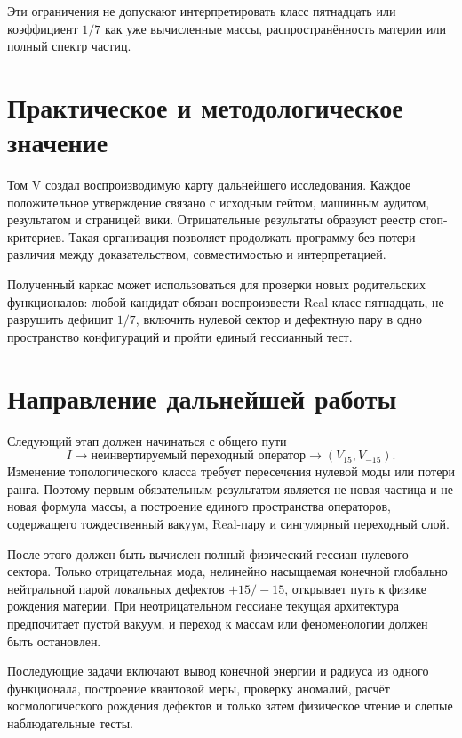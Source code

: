 Эти ограничения не допускают интерпретировать класс пятнадцать или
коэффициент $1/7$ как уже вычисленные массы, распространённость материи
или полный спектр частиц.

\section*{Практическое и методологическое значение}

Том V создал воспроизводимую карту дальнейшего исследования. Каждое
положительное утверждение связано с исходным гейтом, машинным аудитом,
результатом и страницей вики. Отрицательные результаты образуют реестр
стоп-критериев. Такая организация позволяет продолжать программу без
потери различия между доказательством, совместимостью и интерпретацией.

Полученный каркас может использоваться для проверки новых родительских
функционалов: любой кандидат обязан воспроизвести Real-класс пятнадцать,
не разрушить дефицит $1/7$, включить нулевой сектор и дефектную пару в
одно пространство конфигураций и пройти единый гессианный тест.

\section*{Направление дальнейшей работы}

Следующий этап должен начинаться с общего пути
\begin{equation}
 I
 \longrightarrow
 \text{неинвертируемый переходный оператор}
 \longrightarrow
 (V_{15},V_{-15}).
\end{equation}
Изменение топологического класса требует пересечения нулевой моды или
потери ранга. Поэтому первым обязательным результатом является не новая
частица и не новая формула массы, а построение единого пространства
операторов, содержащего тождественный вакуум, Real-пару и сингулярный
переходный слой.

После этого должен быть вычислен полный физический гессиан нулевого
сектора. Только отрицательная мода, нелинейно насыщаемая конечной
глобально нейтральной парой локальных дефектов $+15/-15$, открывает путь к
физике рождения материи. При неотрицательном гессиане текущая архитектура
предпочитает пустой вакуум, и переход к массам или феноменологии должен
быть остановлен.

Последующие задачи включают вывод конечной энергии и радиуса из одного
функционала, построение квантовой меры, проверку аномалий, расчёт
космологического рождения дефектов и только затем физическое чтение и
слепые наблюдательные тесты.


